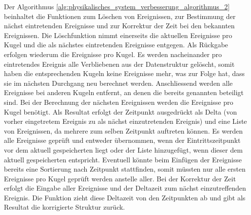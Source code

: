 \newpage
Der Algorithmus \ref{alg:physikalisches_system_verbesserung_algorithmus_2} beinhaltet die Funktionen zum Löschen von
Ereignissen, zur Bestimmung der nächst eintretenden Ereignisse und zur Korrektur der Zeit bei den bekannten Ereignissen.
Die Löschfunktion nimmt einerseits die aktuellen Ereignisse pro Kugel und die als nächstes eintretenden Ereignisse
entgegen. Als Rückgabe erfolgen wiederum die Ereignisse pro Kugel. Es werden nacheinander pro eintretendes Ereignis
alle Verbliebenen aus der Datenstruktur gelöscht, somit haben die entsprechenden Kugeln keine Ereignisse mehr, was
zur Folge hat, dass sie im nächsten Durchgang neu berechnet werden. Anschliessend werden alle Ereignisse bei anderen
Kugeln entfernt, an denen die bereits genannten beteiligt sind. Bei der Berechnung der nächsten Ereignissen werden
die Ereignisse pro Kugel benötigt. Als Resultat erfolgt der Zeitpunkt ausgedrückt als Delta (von vorher eingetretem
Ereignis zu als nächst einzutretenden Ereignis) und eine Liste von Ereignissen, da mehrere zum selben Zeitpunkt
auftreten können. Es werden alle Ereignisse geprüft und entweder übernommen, wenn der Eintrittszeitpunkt vor dem
aktuell gespeicherten liegt oder der Liste hinzugefügt, wenn dieser dem aktuell gespeicherten entspricht.
Eventuell könnte beim Einfügen der Ereignisse bereits eine Sortierung nach Zeitpunkt stattfinden, somit müssten nur
alle ersten Ereignisse pro Kugel geprüft werden anstelle aller. Bei der Korrektur der Zeit erfolgt die Eingabe
aller Ereignisse und der Deltazeit zum nächst einzutreffenden Ereignis. Die Funktion zieht diese Deltazeit von den
Zeitpunkten ab und gibt als Resultat die korrigierte Struktur zurück.
